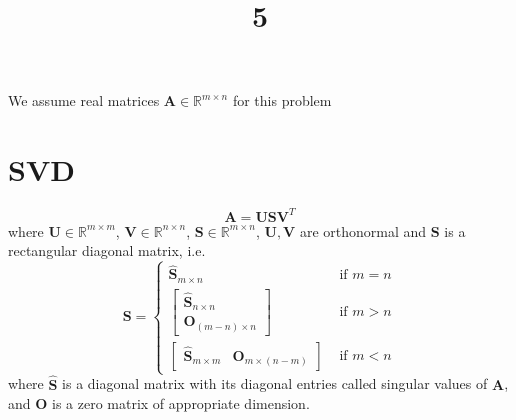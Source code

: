 \documentclass[a4paper,landscape]{article}
\title{5}
\date{}
\begin{document}
\maketitle
We assume real matrices $\bm{A}\in\mathbb{R}^{m\times n}$ for this problem
\section{SVD}
\begin{equation}
	\bm{A} = \bm{U}\bm{S}\bm{V}^T
\end{equation}
where $\bm{U}\in\mathbb{R}^{m\times m}$, $\bm{V}\in\mathbb{R}^{n\times n}$, $\bm{S}\in\mathbb{R}^{m\times n}$, $\bm{U}, \bm{V}$ are orthonormal and $\bm{S}$ is a rectangular diagonal matrix, i.e. 
\begin{equation}
	\bm{S} = 
	\begin{cases}
		\bm{\hat{S}}_{m\times n} & \text{ if $m=n$} \\[1em]
		\begin{bmatrix}
			\bm{\hat{S}}_{n\times n}\\
			\bm{O}_{(m-n) \times n}
		\end{bmatrix} & \text{ if $m>n$} \\[2em]
		\begin{bmatrix}
			\bm{\hat{S}}_{m\times m} & \bm{O}_{m \times (n-m)}
		\end{bmatrix} & \text{ if $m<n$}
	\end{cases}
\end{equation}
where $\bm{\hat{S}}$ is a diagonal matrix with its diagonal entries called singular values of $\bm{A}$, and $\bm{O}$ is a zero matrix of appropriate dimension.
\end{document}
